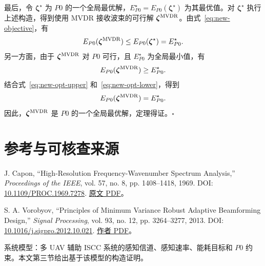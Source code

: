\documentclass[11pt,a4paper]{ctexart}
\begin{document}
最后，令 $\bm\zeta^\star$ 为 $P0$ 的一个全局最优解，$E_{P0}^\star=E_{P0}(\bm\zeta^\star)$ 为其最优值。对 $\bm\zeta^\star$ 执行上述构造，得到使用 MVDR 接收波束的可行解 $\bm\zeta^{\rm MVDR}$。由式~\eqref{eq:new-objective}，有
\begin{equation}\label{eq:new-opt-upper}
E_{P0}(\bm\zeta^{\rm MVDR})\le E_{P0}(\bm\zeta^\star)=E_{P0}^\star.
\end{equation}
另一方面，由于 $\bm\zeta^{\rm MVDR}$ 对 $P0$ 可行，且 $E_{P0}^\star$ 为全局最小值，有
\begin{equation}\label{eq:new-opt-lower}
E_{P0}(\bm\zeta^{\rm MVDR})\ge E_{P0}^\star.
\end{equation}
结合式~\eqref{eq:new-opt-upper} 和~\eqref{eq:new-opt-lower}，得到
\begin{equation}
E_{P0}(\bm\zeta^{\rm MVDR})=E_{P0}^\star.
\end{equation}
因此，$\bm\zeta^{\rm MVDR}$ 是 $P0$ 的一个全局最优解，定理得证。\hfill$\square$

\section*{参考与可核查来源}
\begin{enumerate}[label={[\arabic*]},leftmargin=*]
\item J. Capon, “High-Resolution Frequency-Wavenumber Spectrum Analysis,” \textit{Proceedings of the IEEE}, vol. 57, no. 8, pp. 1408--1418, 1969. DOI: \href{https://doi.org/10.1109/PROC.1969.7278}{10.1109/PROC.1969.7278}. \href{https://epsc.wustl.edu/~ggeuler/reading/cam_noise_biblio/capon_1969-ieee-high-resolution_frequency-wavenumber_spectrum_analysis.pdf}{原文 PDF}。
\item S. A. Vorobyov, “Principles of Minimum Variance Robust Adaptive Beamforming Design,” \textit{Signal Processing}, vol. 93, no. 12, pp. 3264--3277, 2013. DOI: \href{https://doi.org/10.1016/j.sigpro.2012.10.021}{10.1016/j.sigpro.2012.10.021}. \href{https://users.aalto.fi/~vorobys1/SP13.pdf}{作者 PDF}。
\item 系统模型：多 UAV 辅助 ISCC 系统的感知信道、感知速率、能耗目标和 $P0$ 约束。本文第三节给出基于该模型的构造证明。
\end{enumerate}
\end{document}
